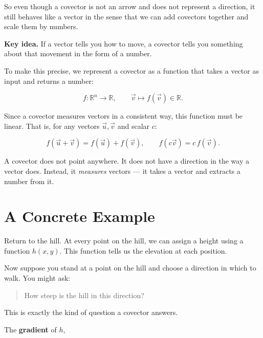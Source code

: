 \documentclass[11pt,openany]{book}
\theoremstyle{definition}
\begin{document}
\medskip

So even though a covector is not an arrow and does not represent a direction, it still 
behaves like a vector in the sense that we can add covectors together and scale them 
by numbers.

\medskip

\textbf{Key idea.} If a vector tells you how to move, a covector tells you something about that movement in the form of a number.

\medskip

To make this precise, we represent a covector as a function that takes a vector as input 
and returns a number:

\[
f: \mathbb{R}^n \to \mathbb{R}, \qquad \vec{v} \mapsto f(\vec{v}) \in \mathbb{R}.
\]

\medskip

Since a covector measures vectors in a consistent way, this function must be linear. 
That is, for any vectors $\vec{u}, \vec{v}$ and scalar $c$:

\[
f(\vec{u} + \vec{v}) = f(\vec{u}) + f(\vec{v}), \qquad 
f(c\vec{v}) = c\,f(\vec{v}).
\]

A covector does not point anywhere. It does not have a direction in the way a vector 
does. Instead, it \textit{measures} vectors --- it takes a vector and extracts a 
number from it.

\section{A Concrete Example}

Return to the hill. At every point on the hill, we can assign a height using a function 
$h(x, y)$. This function tells us the elevation at each position.

\medskip

Now suppose you stand at a point on the hill and choose a direction in which to walk. 
You might ask:

\begin{quote}
How steep is the hill in this direction?
\end{quote}

\medskip

This is exactly the kind of question a covector answers.

\medskip

The \textbf{gradient} of $h$,
\end{document}

